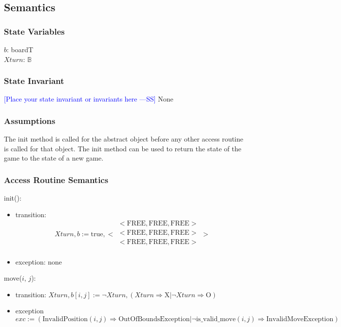\documentclass[12pt,fleqn]{examtst}
\newcommand{\authornote}[3]{\textcolor{#1}{[#3 ---#2]}}
\newcommand{\authornote}[3]{}
\newcommand{\wss}[1]{\authornote{blue}{SS}{#1}}
\begin{document}
\subsection* {Semantics}

\subsubsection* {State Variables}

$b$: boardT\\
$\mathit{Xturn}$: $\mathbb{B}$

\subsubsection* {State Invariant}

\wss{Place your state invariant or invariants here} None

\subsubsection* {Assumptions}

The init method is called for the abstract object before any other access routine is called for that
object.  The init method can be used to return the state of the game to the state of a new game.

\subsubsection* {Access Routine Semantics}

init():
\begin{itemize}
\item transition: 
$$\mathit{Xturn}, b := \text{true}, 
< \begin{array}{c}
< \mbox{FREE}, \mbox{FREE}, \mbox{FREE} >\\
< \mbox{FREE}, \mbox{FREE}, \mbox{FREE} >\\
< \mbox{FREE}, \mbox{FREE}, \mbox{FREE} >\\
\end{array} >
$$
\item exception: none
\end{itemize}

\noindent move($i$, $j$):
\begin{itemize}
\item transition: $\mathit{Xturn}, b[i, j] := \neg \mathit{Xturn}, (\mathit{Xturn} \Rightarrow \mbox{X} | \neg
\mathit{Xturn} \Rightarrow \mbox{O})$
\item exception
$$exc := (\mbox{InvalidPosition}(i, j) \Rightarrow \mbox{OutOfBoundsException} | \neg \mbox{is\_valid\_move}(i, j)
\Rightarrow \mbox{InvalidMoveException})$$
\end{itemize}
\end{document}
